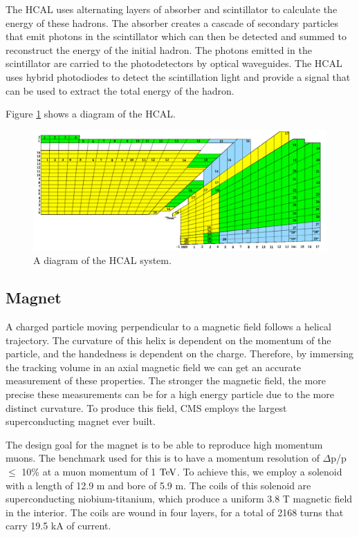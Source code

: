 The HCAL uses alternating layers of absorber and scintillator to calculate the energy of these hadrons.  
The absorber creates a cascade of secondary particles that emit photons in the scintillator which can then be detected and summed to reconstruct the energy of the initial hadron.  
The photons emitted in the scintillator are carried to the photodetectors by optical waveguides.  
The HCAL uses hybrid photodiodes to detect the scintillation light and provide a signal that can be used to extract the total energy of the hadron.  

Figure \ref{figs:CMShcal} shows a diagram of the HCAL.   
\begin{figure}
\begin{center}
\includegraphics[width=1.0\linewidth]{figs/CMShcal.png}
\caption{A diagram of the HCAL system.}
\label{figs:CMShcal}
\end{center}
\end{figure}
  
\subsection{Magnet}
A charged particle moving perpendicular to a magnetic field follows a helical trajectory.  
The curvature of this helix is dependent on the momentum of the particle, and the handedness is dependent on the charge.  
Therefore, by immersing the tracking volume in an axial magnetic field we can get an accurate measurement of these properties.  
The stronger the magnetic field, the more precise these measurements can be for a high energy particle due to the more distinct curvature.  
To produce this field, CMS employs the largest superconducting magnet ever built.  

The design goal for the magnet is to be able to reproduce high momentum muons.  
The benchmark used for this is to have a momentum resolution of $\Delta$p/p $\leq$ 10\% at a muon momentum of 1 $\mathrm{TeV}$.  
To achieve this, we employ a solenoid with a length of 12.9 m and bore of 5.9 m.  
The coils of this solenoid are superconducting niobium-titanium, which produce a uniform 3.8 T magnetic field in the interior. 
The coils are wound in four layers, for a total of 2168 turns that carry 19.5 kA of current.    

